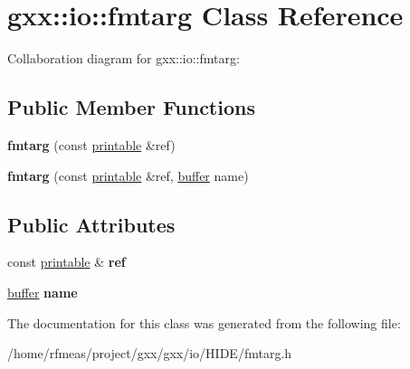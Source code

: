 \hypertarget{classgxx_1_1io_1_1fmtarg}{}\section{gxx\+:\+:io\+:\+:fmtarg Class Reference}
\label{classgxx_1_1io_1_1fmtarg}


Collaboration diagram for gxx\+:\+:io\+:\+:fmtarg\+:
\subsection*{Public Member Functions}
\begin{DoxyCompactItemize}
\item 
{\bfseries fmtarg} (const \hyperlink{classgxx_1_1io_1_1printable}{printable} \&ref)\hypertarget{classgxx_1_1io_1_1fmtarg_ad02731d2ea483d313479ab571b49d6f1}{}\label{classgxx_1_1io_1_1fmtarg_ad02731d2ea483d313479ab571b49d6f1}

\item 
{\bfseries fmtarg} (const \hyperlink{classgxx_1_1io_1_1printable}{printable} \&ref, \hyperlink{classgxx_1_1buffer}{buffer} name)\hypertarget{classgxx_1_1io_1_1fmtarg_a2aeebc21ec74be782cf03902a9fabc78}{}\label{classgxx_1_1io_1_1fmtarg_a2aeebc21ec74be782cf03902a9fabc78}

\end{DoxyCompactItemize}
\subsection*{Public Attributes}
\begin{DoxyCompactItemize}
\item 
const \hyperlink{classgxx_1_1io_1_1printable}{printable} \& {\bfseries ref}\hypertarget{classgxx_1_1io_1_1fmtarg_a2a88c9c07f659582f90a83ef64a0ecb3}{}\label{classgxx_1_1io_1_1fmtarg_a2a88c9c07f659582f90a83ef64a0ecb3}

\item 
\hyperlink{classgxx_1_1buffer}{buffer} {\bfseries name}\hypertarget{classgxx_1_1io_1_1fmtarg_a114fcf4825ebca3a95204a0f19d410de}{}\label{classgxx_1_1io_1_1fmtarg_a114fcf4825ebca3a95204a0f19d410de}

\end{DoxyCompactItemize}


The documentation for this class was generated from the following file\+:\begin{DoxyCompactItemize}
\item 
/home/rfmeas/project/gxx/gxx/io/\+H\+I\+D\+E/fmtarg.\+h\end{DoxyCompactItemize}
